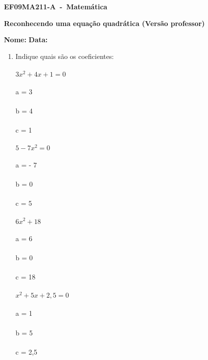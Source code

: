 \documentclass[a4paper,14pt]{article}
\begin{document}
	
	\noindent\textbf{EF09MA211-A~-~Matemática} 
	
	\begin{center}
		\textbf{Reconhecendo uma equação quadrática (Versão professor)}
	\end{center}
	
	\bigskip
	
	\noindent\textbf{Nome:} \underline{\hspace{10cm}}
	\noindent\textbf{Data:} \underline{\hspace{4cm}}
	
	\bigskip
	
	\begin{multicols}{2}
	\begin{enumerate}
		\item Indique quais são os coeficientes: \\
		\\
		$3x^2 + 4x +1 = 0$ \\ \\
		a = 3 \\ \\
		b = 4 \\ \\
		c = 1 \\ \\
		$5 - 7x^2 = 0$ \\ \\
		a = - 7 \\ \\
		b = 0 \\ \\
		c = 5 \\ \\
		$6x^2 + 18$ \\ \\
		a = 6 \\ \\
		b = 0 \\ \\
		c = 18 \\ \\
		$x^2 + 5x + 2,5 = 0$ \\ \\
		a = 1 \\ \\
		b = 5 \\ \\
		c = 2,5 \\ \\

\end{enumerate}
\end{multicols}
\end{document}
